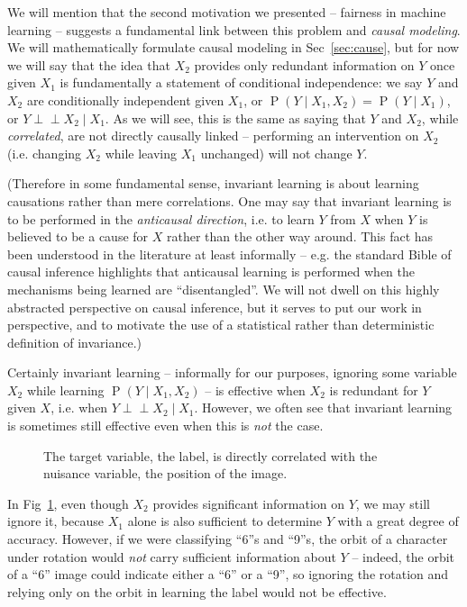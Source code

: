 \documentclass[12pt]{article}
\newcommand{\ci}{\perp\!\!\!\perp}
\newcommand{\Prob}[1]{\operatorname{P}\left(#1\right)}
\theoremstyle{definition}
\numberwithin{equation}{section}
\numberwithin{figure}{section}
\numberwithin{table}{section}
\begin{document}
We will mention that the second motivation we presented -- fairness in machine learning -- suggests a fundamental link between this problem and \emph{causal modeling}. We will mathematically formulate causal modeling in Sec~\ref{sec:cause}, but for now we will say that the idea that $X_2$ provides only redundant information on $Y$ once given $X_1$ is fundamentally a statement of conditional independence: we say $Y$ and $X_2$ are conditionally independent given $X_1$, or $\Prob{Y\mid X_1, X_2}=\Prob{Y\mid X_1}$, or $Y\ci X_2\mid X_1$. As we will see, this is the same as saying that $Y$ and $X_2$, while \emph{correlated}, are not directly causally linked -- performing an intervention on $X_2$ (i.e. changing $X_2$ while leaving $X_1$ unchanged) will not change $Y$. 

(Therefore in some fundamental sense, invariant learning is about learning causations rather than mere correlations. One may say that invariant learning is to be performed in the \emph{anticausal direction}, i.e. to learn $Y$ from $X$ when $Y$ is believed to be a cause for $X$ rather than the other way around. This fact has been understood in the literature at least informally -- e.g. the standard Bible of causal inference \cite{elements} highlights that anticausal learning is performed when the mechanisms being learned are ``disentangled''. We will not dwell on this highly abstracted perspective on causal inference, but it serves to put our work in perspective, and to motivate the use of a statistical rather than deterministic definition of invariance.)

Certainly invariant learning -- informally for our purposes, ignoring some variable $X_2$ while learning $\Prob{Y\mid X_1, X_2}$ -- is effective when $X_2$ is redundant for $Y$ given $X$, i.e. when $Y\ci X_2\mid X_1$. However, we often see that invariant learning is sometimes still effective even when this is \emph{not} the case.

\begin{figure}
    \centering
    
    \caption{The target variable, the label, is directly correlated with the nuisance variable, the position of the image. }
    \label{fig:real-sample-0}
\end{figure}

In Fig~\ref{fig:real-sample-0}, even though $X_2$ provides significant information on $Y$, we may still ignore it, because $X_1$ alone is also sufficient to determine $Y$ with a great degree of accuracy. However, if we were classifying ``6''s and ``9''s, the orbit of a character under rotation would \emph{not} carry sufficient information about $Y$ -- indeed, the orbit of a ``6'' image could indicate either a ``6'' or a ``9'', so ignoring the rotation and relying only on the orbit in learning the label would not be effective. 
\end{document}
